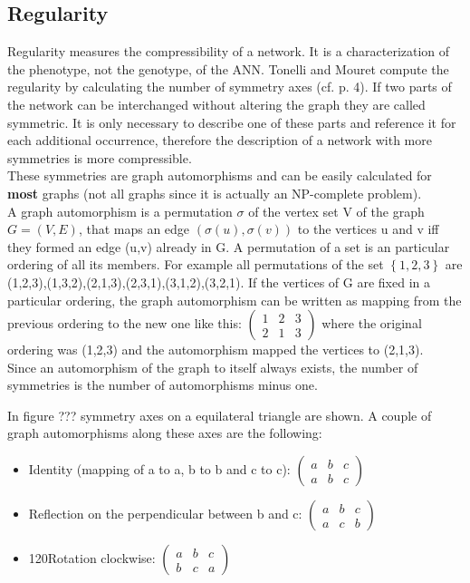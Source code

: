 \documentclass[12pt,twoside]{article}
\theoremstyle{plain}
\theoremstyle{definition}
\theoremstyle{remark}
\begin{document}
\subsection{Regularity}
\label{regularity}
Regularity measures the compressibility of a network. It is a characterization of the phenotype, not the genotype, of the ANN.
Tonelli and Mouret compute the regularity by calculating the number of symmetry axes (cf. \cite{citeulike:12788284} p. 4).
If two parts of the network can be interchanged without altering the graph they are called symmetric.
It is only necessary to describe one of these parts and reference it for each additional occurrence, therefore the description of a network with more symmetries is more compressible.\\
These symmetries are graph automorphisms and can be easily calculated for \textbf{most} graphs (not all graphs since it is actually an NP-complete problem).\\
A graph automorphism is a permutation $\sigma$ of the vertex set V of the graph $G = (V,E)$, that maps an edge $(\sigma(u),\sigma(v))$ to the vertices u and v iff they formed an edge (u,v) already in G. A permutation of a set is an particular ordering of all its members. For example all permutations of the set $\left\{ 1,2,3 \right\}$ are (1,2,3),(1,3,2),(2,1,3),(2,3,1),(3,1,2),(3,2,1). If the vertices of G are fixed in a particular ordering, the graph automorphism can be written as mapping from the previous ordering to the new one like this: 
$
\begin{pmatrix}
1 & 2 & 3 \\
2 & 1 & 3
\end{pmatrix}
$ where the original ordering was (1,2,3) and the automorphism mapped the vertices to (2,1,3).\\
Since an automorphism of the graph to itself always exists, the number of symmetries is the number of automorphisms minus one.\medskip

In figure ??? symmetry axes on a equilateral triangle are shown. A couple of graph automorphisms along these axes are the following:
\begin{itemize}
	\item Identity (mapping of a to a, b to b and c to c):
	$
	\begin{pmatrix}
	a & b & c \\
	a & b & c
	\end{pmatrix}
	$
	\item Reflection on the perpendicular between b and c:
	$
	\begin{pmatrix}
	a & b & c \\
	a & c & b
	\end{pmatrix}
	$
	\item 120\degree Rotation clockwise:
	$
	\begin{pmatrix}
	a & b & c \\
	b & c & a
	\end{pmatrix}
	$
\end{itemize} 
\end{document}
